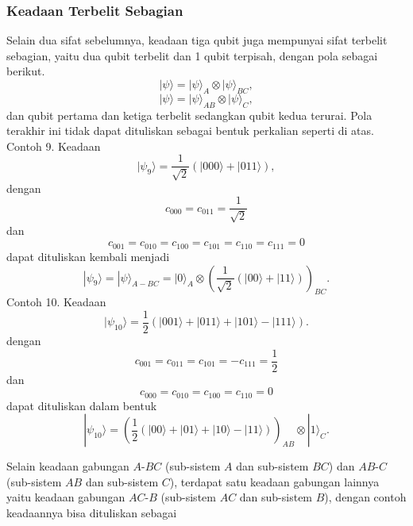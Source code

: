 \subsubsection{Keadaan Terbelit Sebagian}
\par
Selain dua sifat sebelumnya, keadaan tiga qubit juga mempunyai sifat terbelit sebagian, yaitu dua qubit terbelit dan 1 qubit terpisah, dengan pola sebagai berikut.
\begin{equation}
	|\psi\rangle
	=
	|\psi\rangle_{A} \otimes
	|\psi\rangle_{BC},
\end{equation}
\begin{equation}
	|\psi\rangle
	=
	|\psi\rangle_{AB} \otimes
	|\psi\rangle_{C},
\end{equation}
dan qubit pertama dan ketiga terbelit sedangkan qubit kedua terurai. Pola terakhir ini tidak dapat dituliskan sebagai bentuk perkalian seperti di atas.
Contoh 9. Keadaan
\begin{equation}
	|\psi_9\rangle =
	\frac{1}{\sqrt{2}}
	\left(
	|000\rangle + |011\rangle
	\right) ,
\end{equation}
dengan
\begin{equation}
	c_{000}=c_{011}=\frac{1}{\sqrt{2}}
\end{equation}
dan
\begin{equation}
	c_{001}=c_{010}=c_{100}=c_{101}=c_{110}=c_{111}=0
\end{equation}
dapat dituliskan kembali menjadi
\begin{equation}
	|\psi_9\rangle
	=
	|\psi\rangle_{A-BC}
	=
	|0\rangle_A \otimes
	\left(
	\frac{1}{\sqrt{2}}
	(|00\rangle + |11\rangle)
	\right)_{BC} .
\end{equation}
Contoh 10. Keadaan
\begin{equation}
	|\psi_{10}\rangle
	=
	\frac{1}{2}
	\left(
	|001\rangle + |011\rangle + |101\rangle - |111\rangle
	\right) .
\end{equation}
dengan
\begin{equation}
	c_{001}=c_{011}=c_{101}=-c_{111}=\frac{1}{2}
\end{equation}
dan
\begin{equation}
	c_{000}=c_{010}=c_{100}=c_{110}=0
\end{equation}
dapat dituliskan dalam bentuk
\begin{equation}
	|\psi_{10}\rangle
	=
	\left(
	\frac{1}{2}
	(|00\rangle + |01\rangle + |10\rangle - |11\rangle)
	\right)_{AB}
	\otimes
	|1\rangle_C .
\end{equation}
\par
Selain keadaan gabungan $A$-$BC$ (sub-sistem $A$ dan sub-sistem $BC$) dan $AB$-$C$ (sub-sistem $AB$ dan sub-sistem $C$), terdapat satu keadaan gabungan lainnya yaitu keadaan gabungan $AC$-$B$ (sub-sistem $AC$ dan sub-sistem $B$), dengan contoh
keadaannya bisa dituliskan sebagai

